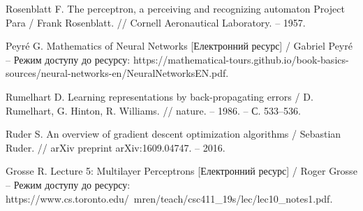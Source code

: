 \begin{thebibliography}{9}
    Rosenblatt F. The perceptron, a perceiving and recognizing automaton Project Para / Frank Rosenblatt. // Cornell Aeronautical Laboratory. – 1957.

    Peyré G. Mathematics of Neural Networks [Електронний ресурс] / Gabriel Peyré – Режим доступу до ресурсу: https://mathematical-tours.github.io/book-basics-sources/neural-networks-en/NeuralNetworksEN.pdf.

    Rumelhart D. Learning representations by back-propagating errors / D. Rumelhart, G. Hinton, R. Williams. // nature. – 1986. – С. 533–536.

    Ruder S. An overview of gradient descent optimization algorithms / Sebastian Ruder. // arXiv preprint arXiv:1609.04747. – 2016.

    Grosse R. Lecture 5: Multilayer Perceptrons [Електронний ресурс] / Roger Grosse – Режим доступу до ресурсу: https://www.cs.toronto.edu/~mren/teach/csc411\_19s/lec/lec10\_notes1.pdf.
\end{thebibliography}